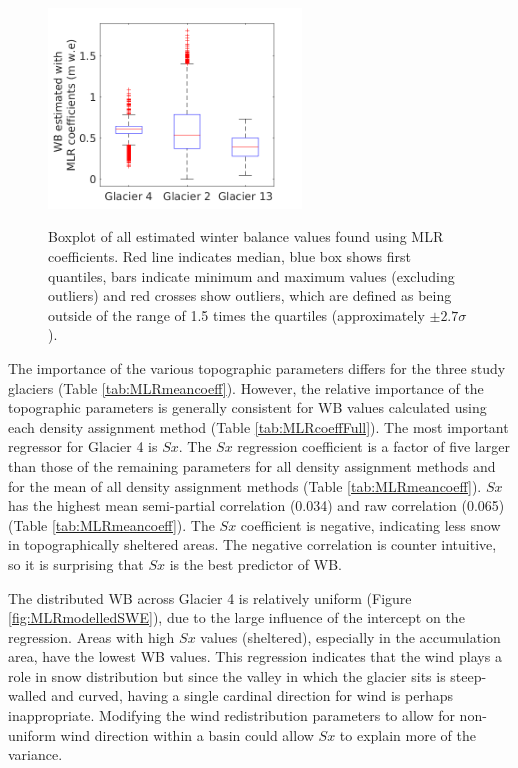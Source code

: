 \documentclass{sfuthesis}
\newcommand{\boxMatlab}{Red line indicates median, blue box shows first quantiles, bars indicate minimum and maximum values (excluding outliers) and red crosses show outliers, which are defined as being outside of the range of 1.5 times the quartiles (approximately $\pm2.7\sigma$). }
\begin{document}
\begin{figure}[H]
\centering
	\includegraphics[width =0.6\textwidth]{ModelledSWE_box_MLR.png}\\
\caption[Boxplot of all estimated winter balance values found using MLR coefficients]{Boxplot of all estimated winter balance values found using MLR coefficients. \boxMatlab}
\label{fig:MLRsweboxplot}
\end{figure} 

The importance of the various topographic parameters differs for the three study glaciers (Table \ref{tab:MLRmeancoeff}). However, the relative importance of the topographic parameters is generally consistent for WB values calculated using each density assignment method (Table \ref{tab:MLRcoeffFull}). The most important regressor for Glacier 4 is $Sx$. The $Sx$ regression coefficient is a factor of five larger than those of the remaining parameters for all density assignment methods  and for the mean of all density assignment methods (Table \ref{tab:MLRmeancoeff}). $Sx$ has the highest mean semi-partial correlation (0.034)  and raw correlation (0.065) (Table \ref{tab:MLRmeancoeff}). The $Sx$ coefficient is negative, indicating less snow in topographically sheltered areas. The negative correlation is counter intuitive, so it is surprising that $Sx$ is the best predictor of WB.

The distributed WB across Glacier 4 is relatively uniform (Figure \ref{fig:MLRmodelledSWE}), due to the large influence of the intercept on the regression. Areas with high $Sx$ values (sheltered), especially in the accumulation area, have the lowest WB values. This regression indicates that the wind plays a role in snow distribution but since the valley in which the glacier sits is steep-walled and curved, having a single cardinal direction for wind is perhaps inappropriate. Modifying the wind redistribution parameters to allow for non-uniform wind direction within a basin could allow $Sx$ to explain more of the variance. 
\end{document}
